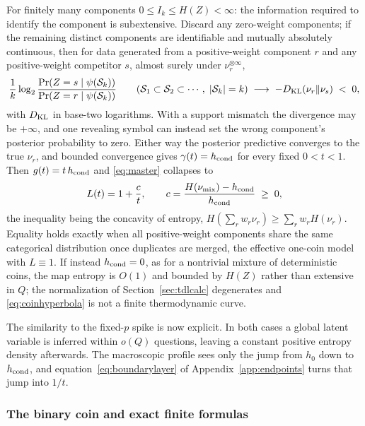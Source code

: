 For finitely many components $0 \le I_k \le H(Z) < \infty$: the
information required to identify the component is subextensive.
Discard any zero-weight components; if the remaining distinct
components are identifiable and mutually absolutely continuous, then
for data generated from a positive-weight component $r$ and any
positive-weight competitor $s$, almost surely under
$\nu_r^{\otimes\infty}$,
%
\begin{equation}
  \frac1k\log_2
  \frac{\Pr(Z = s\mid\psi(\mathcal S_k))}
       {\Pr(Z = r\mid\psi(\mathcal S_k))}
  \qquad
  (\mathcal S_1 \subset \mathcal S_2 \subset \cdots,
   \;|\mathcal S_k| = k)
  \;\longrightarrow\;
  -D_{\rm KL}(\nu_r\Vert\nu_s) \;<\; 0,
  \label{eq:coinodds}
\end{equation}
%
with $D_{\rm KL}$ in base-two logarithms. With a support mismatch the
divergence may be $+\infty$, and one revealing symbol can instead set
the wrong component's posterior probability to zero. Either way the
posterior predictive converges to the true $\nu_r$, and bounded
convergence gives $\gamma(t) = h_{\rm cond}$ for every fixed
$0 < t < 1$. Then $g(t) = t\,h_{\rm cond}$ and \eqref{eq:master}
collapses to
%
\begin{equation}
  L(t) = 1 + \frac ct,
  \qquad
  c = \frac{H(\nu_{\rm mix}) - h_{\rm cond}}{h_{\rm cond}} \;\ge\; 0,
  \label{eq:coinhyperbola}
\end{equation}
%
the inequality being the concavity of entropy,
$H(\sum_r w_r\nu_r) \ge \sum_r w_r H(\nu_r)$. Equality holds exactly
when all positive-weight components share the same categorical
distribution once duplicates are merged, the effective one-coin model
with $L \equiv 1$. If instead $h_{\rm cond} = 0$, as for a nontrivial
mixture of deterministic coins, the map entropy is $O(1)$ and bounded
by $H(Z)$ rather than extensive in $Q$; the normalization of
Section~\ref{sec:tdlcalc} degenerates and
\eqref{eq:coinhyperbola} is not a finite thermodynamic curve.

The similarity to the fixed-$p$ spike is now explicit. In both cases
a global latent variable is inferred within $o(Q)$ questions, leaving
a constant positive entropy density afterwards. The macroscopic
profile sees only the jump from $h_0$ down to $h_{\rm cond}$, and
equation~\eqref{eq:boundarylayer} of
Appendix~\ref{app:endpoints} turns that jump into $1/t$.

\subsubsection{The binary coin and exact finite formulas}

